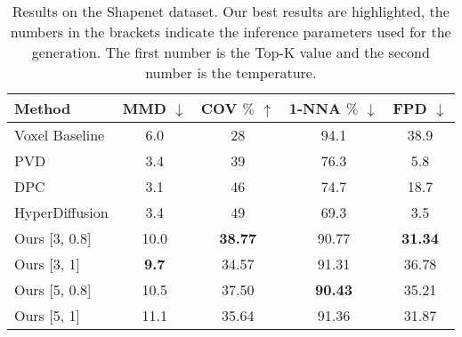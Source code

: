 \begin{table}[H]
  \small
  \begin{tabular}{l c c c c}
    \toprule
    Method         & MMD $\downarrow$ & COV \(\%\) $\uparrow$ & 1-NNA \(\%\) $\downarrow$ & FPD $\downarrow$ \\
    \midrule
    Voxel Baseline & 6.0              & 28                    & 94.1                      & 38.9             \\
    PVD            & 3.4              & 39                    & 76.3                      & 5.8              \\
    DPC            & 3.1              & 46                    & 74.7                      & 18.7             \\
    HyperDiffusion & 3.4              & 49                    & 69.3                      & 3.5              \\

    \midrule

    Ours [3, 0.8]  & 10.0             & \textbf{38.77}        & 90.77                     & \textbf{31.34}   \\
    Ours [3, 1]    & \textbf{9.7}     & 34.57                 & 91.31                     & 36.78            \\
    Ours [5, 0.8]  & 10.5             & 37.50                 & \textbf{90.43}            & 35.21            \\
    Ours [5, 1]    & 11.1             & 35.64                 & 91.36                     & 31.87            \\
    \bottomrule
  \end{tabular}
  \caption{\label{tab:shapenet} Results on the Shapenet dataset. Our best results are highlighted, the numbers in the brackets indicate the inference parameters used for the generation. The first number is the Top-K value and the second number is the temperature.}
\end{table}
